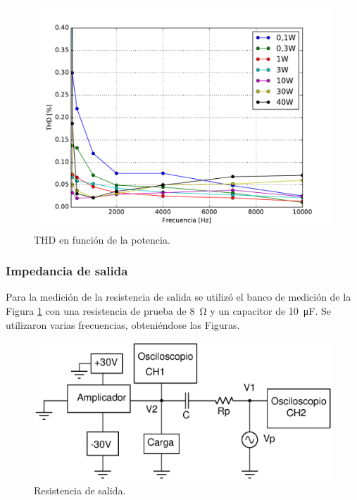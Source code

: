 		\begin{figure}[H]
			\centering
			\includegraphics[scale=0.6]{./Figuras/thd_zoom.pdf}
			\caption{THD en función de la potencia.}
		\end{figure}



%
%
		\subsubsection{Impedancia de salida}

		Para la medición de la resistencia de salida se utilizó el banco de medición de la Figura \ref{fig:bco_zo} con una resistencia de prueba de \SI{8}{\ohm} y un capacitor de \SI{10}{\micro\farad}. Se utilizaron varias frecuencias, obteniéndose las Figuras.



\begin{figure}[H]
	\centering
	\includegraphics[scale=0.5]{./Figuras/bco_zo_salida.eps}
	\caption{Resistencia de salida.}
	\label{fig:bco_zo}
\end{figure}

